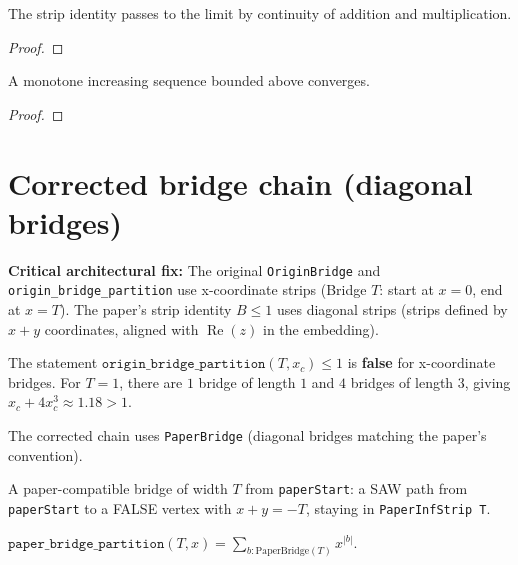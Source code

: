 \begin{theorem}\label{thm:strip_limit}
\leanok
  The strip identity passes to the limit by continuity of
  addition and multiplication.
\end{theorem}
\begin{proof}
\leanok
\end{proof}

\begin{theorem}\label{thm:mono_conv}
\leanok
  A monotone increasing sequence bounded above converges.
\end{theorem}
\begin{proof}
\leanok
\end{proof}

\section{Corrected bridge chain (diagonal bridges)}

\textbf{Critical architectural fix:}
The original \texttt{OriginBridge} and \texttt{origin\_bridge\_partition}
use x-coordinate strips (Bridge $T$: start at $x=0$, end at $x=T$).
The paper's strip identity $B \leq 1$ uses diagonal strips
(strips defined by $x+y$ coordinates, aligned with $\operatorname{Re}(z)$
in the embedding).

The statement $\texttt{origin\_bridge\_partition}(T, x_c) \leq 1$ is
\textbf{false} for x-coordinate bridges. For $T=1$, there are $1$ bridge
of length $1$ and $4$ bridges of length $3$, giving
$x_c + 4x_c^3 \approx 1.18 > 1$.

The corrected chain uses \texttt{PaperBridge} (diagonal bridges matching
the paper's convention).

\begin{definition}\label{def:paper_bridge}
\leanok
{}
  A paper-compatible bridge of width $T$ from \texttt{paperStart}:
  a SAW path from \texttt{paperStart} to a FALSE vertex with
  $x+y = -T$, staying in \texttt{PaperInfStrip T}.
\end{definition}

\begin{definition}\label{def:paper_bridge_partition}
\leanok
{}
  $\texttt{paper\_bridge\_partition}(T, x) = \sum_{b : \text{PaperBridge}(T)} x^{|b|}$.
\end{definition}

